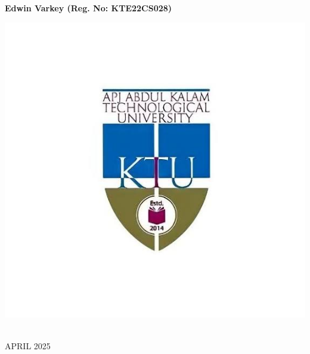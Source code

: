 \begin{center}
\large {\textbf{Edwin Varkey (Reg. No: KTE22CS028)}}\\
\begin{center}
\includegraphics[scale=0.25]{ktu.jpg}
\end{center}
\fontsize{18pt}{12pt}
\\\vspace{10pt}
\normalsize {APRIL 2025}
\end{center}